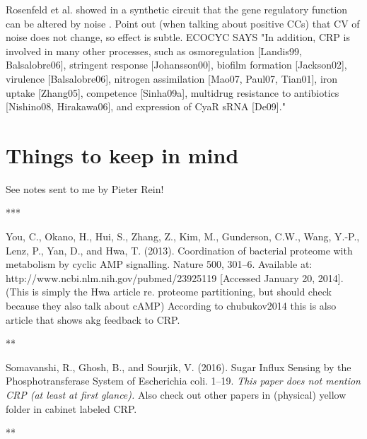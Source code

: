 Rosenfeld et al. showed in a synthetic circuit that the gene regulatory function can be altered by noise \cite{Rosenfeld2005}.
%
Point out (when talking about positive CCs) that CV of noise does not change, so effect is subtle.
%
ECOCYC SAYS "In addition, CRP is involved in many other processes, such as osmoregulation [Landis99, Balsalobre06], stringent response [Johansson00], biofilm formation [Jackson02], virulence [Balsalobre06], nitrogen assimilation [Mao07, Paul07, Tian01], iron uptake [Zhang05], competence [Sinha09a], multidrug resistance to antibiotics [Nishino08, Hirakawa06], and expression of CyaR sRNA [De09]."


\section*{Things to keep in mind}

See notes sent to me by Pieter Rein!

***

\cite{You2013}
You, C., Okano, H., Hui, S., Zhang, Z., Kim, M., Gunderson, C.W., Wang, Y.-P., Lenz, P., Yan, D., and Hwa, T. (2013). Coordination of bacterial proteome with metabolism by cyclic AMP signalling. Nature 500, 301–6. Available at: http://www.ncbi.nlm.nih.gov/pubmed/23925119 [Accessed January 20, 2014].
(This is simply the Hwa article re. proteome partitioning, but should check because they also talk about cAMP)
According to chubukov2014 this is also article that shows akg feedback to CRP.

**

\cite{Somavanshi2016}
Somavanshi, R., Ghosh, B., and Sourjik, V. (2016). Sugar Influx Sensing by the Phosphotransferase System of Escherichia coli. 1–19.
\textit{This paper does not mention CRP (at least at first glance).}
Also check out other papers in (physical) yellow folder in cabinet labeled CRP.

**

